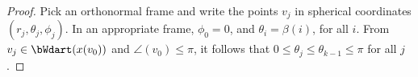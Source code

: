 \begin{proof}  
%
%
%
Pick an orthonormal frame and write the points $v_j$ in spherical coordinates $(r_j,\theta_j,\phi_j)$.  In an appropriate frame, $\phi_0=0$, and $\theta_i=\beta(i)$, for all $i$.  From $v_j\in \bWdart(x(v_0))$ and $\angle(v_0)\le\pi$, it follows that $0\le\theta_j\le\theta_{k-1}\le\pi$ for all $j$.


\end{proof}
